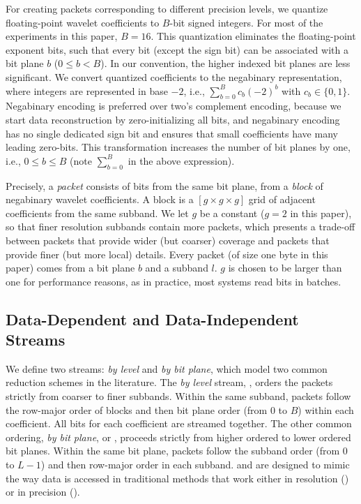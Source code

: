 For creating packets corresponding to different precision levels, we quantize floating-point wavelet
coefficients to $B$-bit signed integers. For most of the experiments in this paper, $B=16$. This
quantization eliminates the floating-point exponent bits, such that every bit (except the sign bit)
can be associated with a bit plane $b$ ($0\leq b < B$). In our convention, the higher indexed bit
planes are less significant. We convert quantized coefficients to the negabinary representation,
where integers are represented in base $-2$, i.e., $\sum_{b=0}^{B}{c_b(-2)^b}$ with $c_b\in
\{0,1\}$. Negabinary encoding is preferred over two's complement encoding, because we start data
reconstruction by zero-initializing all bits, and negabinary encoding has no single dedicated sign
bit and ensures that small coefficients have many leading zero-bits.
%
This transformation increases the number of bit planes by one, i.e., $0\leq b \leq B$ 
(note $\sum_{b=0}^{B}$ in the above expression).

Precisely, a \emph{packet} consists of bits from the same bit plane, from a \emph{block} of
negabinary wavelet coefficients. A block is a $[g\times g\times g]$ grid of adjacent coefficients
from the same subband. We let $g$ be a constant ($g=2$ in this paper), so that finer resolution
subbands contain more packets, which presents a trade-off between packets that provide wider (but
coarser) coverage and packets that provide finer (but more local) details. Every packet (of size one
byte in this paper) comes from a bit plane $b$ and a subband $l$. $g$ is chosen to be larger than
one for performance reasons, as in practice, most systems read bits in batches.

\subsection{Data-Dependent and Data-Independent Streams} \label{sec:static-dynamic-streams}

We define two streams: \emph{by level} and \emph{by bit plane}, which model two common reduction
schemes in the literature. The \emph{by level} stream, \slvl, orders the packets strictly from
coarser to finer subbands. Within the same subband, packets follow the row-major order of blocks and
then bit plane order (from 0 to $B$) within each coefficient. All bits for each coefficient are
streamed together. The other common ordering, \emph{by bit plane}, or \sbit, proceeds strictly from
higher ordered to lower ordered bit planes. Within the same bit plane, packets follow the subband
order (from $0$ to $L-1$) and then row-major order in each subband. \slvl and \sbit are designed to
mimic the way data is accessed in traditional methods that work either in resolution (\slvl) or in
precision (\sbit).

